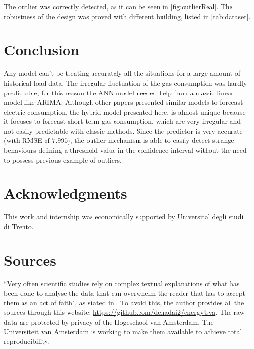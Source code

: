 \documentclass{sig-alternate-sigmod07}
\begin{document}
The outlier was correctly detected, as it can be seen in \cref{fig:outlierReal}. The robustness of the design was proved with different building, listed in \cref{tab:dataset}.

\section{Conclusion}

Any model can't be treating accurately all the situations for a large amount of historical load data. The irregular fluctuation of the gas consumption was hardly predictable, for this reason the ANN model needed help from a classic linear model like ARIMA. Although other papers presented similar models to forecast electric consumption, the hybrid model presented here, is almost unique because it focuses to forecast short-term gas consumption, which are very irregular and not easily predictable with classic methods. Since the predictor is very accurate (with RMSE of $7.995$), the outlier mechanism is able to easily detect strange behaviours defining a threshold value in the confidence interval without the need to possess previous example of outliers.






\section{Acknowledgments}
This work and internship was economically supported by Universita' degli studi di Trento.

%

%
%
\appendix
\section{Sources}
``Very often scientific studies rely on complex textual explanations of what has been done to analyse the data that can overwhelm the reader that has to accept them as an act of faith", as stated in \cite{reproducibility}. To avoid this, the author provides all the sources through this website: \url{https://github.com/denadai2/energyUva}. The raw data are protected by privacy of the Hogeschool van Amsterdam. The Universiteit van Amsterdam is working to make them available to achieve total reproducibility.


\balancecolumns %
\end{document}
